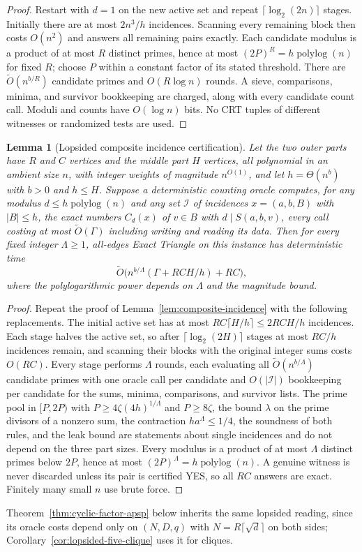 \documentclass[11pt]{article}
\newtheorem{lemma}[theorem]{Lemma}
\newcommand{\softO}{\widetilde O}
\begin{document}
\begin{proof}
Restart with $d=1$ on the new active set and repeat
$\lceil\log_2(2n)\rceil$ stages. Initially there are at most $2n^3/h$
incidences. Scanning every remaining block then costs $O(n^2)$ and answers
all remaining pairs exactly. Each candidate modulus is a product of at
most $R$ distinct primes, hence at most $(2P)^R=h\operatorname{polylog}(n)$
for fixed $R$; choose $P$ within a constant factor of its stated threshold.
There are $\softO(n^{b/R})$ candidate primes and $O(R\log n)$ rounds.
A sieve, comparisons, minima, and survivor bookkeeping are charged, along
with every candidate count call. Moduli and counts have $O(\log n)$ bits.
No CRT tuples of different witnesses or randomized tests are used.
\end{proof}
\begin{lemma}[Lopsided composite incidence certification]
\label{lem:composite-incidence-lopsided}
Let the two outer parts have $R$ and $C$ vertices and the middle part $H$
vertices, all polynomial in an ambient size $n$, with integer weights of
magnitude $n^{O(1)}$, and let $h=\Theta(n^b)$ with $b>0$ and $h\le H$.
Suppose a deterministic counting oracle computes, for any modulus
$d\le h\operatorname{polylog}(n)$ and any set $\mathcal I$ of incidences
$x=(a,b,B)$ with $|B|\le h$, the exact numbers $C_d(x)$ of $v\in B$ with
$d\mid S(a,b,v)$, every call costing at most $\softO(\Gamma)$ including
writing and reading its data. Then for every fixed integer $\Lambda\ge1$,
all-edges Exact Triangle on this instance has deterministic time
\[
\softO\bigl(n^{b/\Lambda}(\Gamma+RCH/h)+RC\bigr),
\]
where the polylogarithmic power depends on $\Lambda$ and the magnitude bound.
\end{lemma}
\begin{proof}
Repeat the proof of Lemma~\ref{lem:composite-incidence} with the following
replacements. The initial active set has at most
$RC\lceil H/h\rceil\le2RCH/h$ incidences. Each stage halves the active set,
so after $\lceil\log_2(2H)\rceil$ stages at most $RC/h$ incidences remain,
and scanning their blocks with the original integer sums costs $O(RC)$.
Every stage performs $\Lambda$ rounds, each evaluating all
$\softO(n^{b/\Lambda})$ candidate primes with one oracle call per candidate
and $O(|\mathcal I|)$ bookkeeping per candidate for the sums, minima,
comparisons, and survivor lists. The prime pool in $[P,2P)$ with
$P\ge4\zeta(4h)^{1/\Lambda}$ and $P\ge8\zeta$, the bound $\lambda$ on the
prime divisors of a nonzero sum, the contraction $ha^\Lambda\le1/4$, the
soundness of both rules, and the leak bound are statements about single
incidences and do not depend on the three part sizes. Every modulus is a
product of at most $\Lambda$ distinct primes below $2P$, hence at most
$(2P)^\Lambda=h\operatorname{polylog}(n)$. A genuine witness is never
discarded unless its pair is certified YES, so all $RC$ answers are exact.
Finitely many small $n$ use brute force.
\end{proof}
Theorem~\ref{thm:cyclic-factor-apsp} below inherits the same lopsided
reading, since its oracle costs depend only on $(N,D,q)$ with
$N=R\lceil\sqrt d\rceil$ on both sides; Corollary~\ref{cor:lopsided-five-clique}
uses it for cliques.
\end{document}

